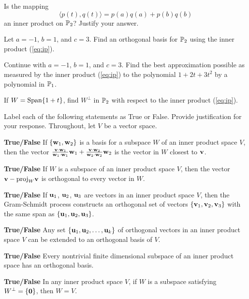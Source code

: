 \item Is the mapping 
 \begin{equation} \label{eq:ip_2}
 \langle p(t),q(t) \rangle = p(a)q(a) + p(b)q(b)
 \end{equation}
 an inner product on $\mathbb{P}_2$? Justify your answer. 
 
 \item Let $a = -1$, $b=1$, and $c=3$. Find an orthogonal basis for $\mathbb{P}_2$ using the inner product (\ref{eq:ip}).  
 
 \item Continue with $a = -1$, $b=1$, and $c=3$. Find the best approximation possible as measured by the inner product (\ref{eq:ip}) to the polynomial $1 + 2t + 3t^2$ by a polynomial in $\mathbb{P}_1$.
 
 \item If $W = \text{Span}\{1+t\}$, find $W^{\perp}$ in $\mathbb{P}_2$ with respect to the inner product (\ref{eq:ip}). 
 
 \ea

\item Label each of the following statements as True or False. Provide justification for your response. Throughout, let $V$ be a vector space. 
	\ba
	\item \textbf{True/False} If $\{\mathbf{w}_1, \mathbf{w}_2\}$ is a basis for a subspace $W$ of an inner product space $V$, then the vector $\frac{\mathbf{v} \cdot \mathbf{w}_1}{\mathbf{w}_1 \cdot \mathbf{w}_1} \mathbf{w}_1 + \frac{\mathbf{v} \cdot \mathbf{w}_2}{\mathbf{w}_2 \cdot \mathbf{w}_2}  \mathbf{w}_2$ is the vector in $W$ closest to $\mathbf{v}$. 
	\item \textbf{True/False}  If $W$ is a subspace of an inner product space $V$, then the vector $\mathbf{v} - \text{proj}_{W} \mathbf{v}$ is orthogonal to every vector in $W$.
	\item \textbf{True/False} If $\mathbf{u}_1$, $\mathbf{u}_2$, $\mathbf{u}_3$ are vectors in an inner product space $V$, then the Gram-Schmidt process constructs an orthogonal set of vectors $\{\mathbf{v}_1, \mathbf{v}_2, \mathbf{v}_3\}$ with the same span as $\{\mathbf{u}_1, \mathbf{u}_2, \mathbf{u}_3\}$. 
	\item \textbf{True/False} Any set $\{\mathbf{u}_1, \mathbf{u}_2, \ldots, \mathbf{u}_k\}$ of orthogonal vectors in an inner product space $V$ can be extended to an orthogonal basis of $V$. 
	\item \textbf{True/False} Every nontrivial finite dimensional subspace of an inner product space has an orthogonal basis. 
	\item \textbf{True/False} In any inner product space $V$, if $W$ is a subspace satisfying $W^\perp=\{\mathbf{0}\}$, then $W=V$. 
	 \ea

